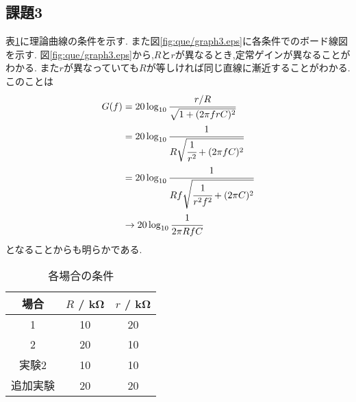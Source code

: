 \subsection{課題3}
表\ref{tab:jouken}に理論曲線の条件を示す.
また図\ref{fig:que/graph3.eps}に各条件でのボード線図を示す.
図\ref{fig:que/graph3.eps}から,$R$と$r$が異なるとき,定常ゲインが異なることがわかる.
また$r$が異なっていても$R$が等しければ同じ直線に漸近することがわかる.このことは
\begin{align}
  G(f)&=20\log_{10}\cfrac{r/R}{\sqrt{1+(2\pi frC)^2}}\\
  &=20\log_{10}\cfrac{1}{R\sqrt{\cfrac{1}{r^2}+(2\pi fC)^2}}\\
  &=20\log_{10}\cfrac{1}{Rf\sqrt{\cfrac{1}{r^2f^2}+(2\pi C)^2}}\\
  &\rightarrow20\log_{10}\cfrac{1}{2\pi RfC}
\end{align}
となることからも明らかである.
\begin{table}[h]
  \caption{各場合の条件}
  \label{tab:jouken}
  \centering
  \begin{tabular}{ccc}
    \hline
    場合&$R$ / \si{\kilo\ohm}&$r$ / \si{\kilo\ohm}\\
    \hline \hline
    1&10&20\\
    2&20&10\\
    実験2&10&10\\
    追加実験&20&20\\
    \hline
  \end{tabular}
\end{table}
